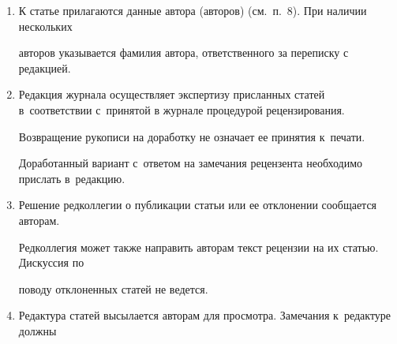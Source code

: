 {{\begin{enumerate}[1.]
или в~электронном виде (отсканированная копия заполненного и~подписанного документа).








Редколлегия вправе запросить у авторов экспертное заключение о~возможности


пуб\-ли\-ка\-ции представленной статьи в~открытой печати.\\[-12pt]





\item К статье прилагаются данные автора (авторов) (см.\ п.~8). При наличии нескольких


авторов указывается фамилия автора, ответственного за переписку с редакцией.\\[-12pt]





\item Редакция журнала осуществляет экспертизу присланных статей в~соответствии с~принятой в журнале процедурой рецензирования.





Возвращение рукописи на доработку не означает ее принятия к~печати.





Доработанный вариант с~ответом на замечания рецензента необходимо прислать в~редакцию.\\[-12pt]





\item Решение редколлегии о публикации статьи или ее отклонении сообщается авторам.





Редколлегия может также направить авторам текст рецензии на их статью. Дискуссия по


поводу отклоненных статей не ведется.\\[-14pt]










\item Редактура статей высылается авторам для просмотра. Замечания к~редактуре должны



\end{enumerate}}}
